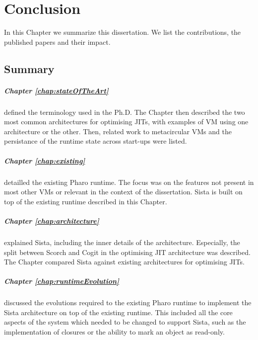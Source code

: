 \documentclass[a4paper,12pt,twoside]{../includes/ThesisStyle}
\begin{document}
\fi

\chapter{Conclusion}
\label{chap:conclusion}
\minitoc

In this Chapter we summarize this dissertation. We list the contributions, the published papers and their impact.

\section{Summary}

\paragraph{Chapter \ref{chap:stateOfTheArt}} defined the terminology used in the Ph.D. The Chapter then described the two most common architectures for optimising JITs, with examples of VM using one architecture or the other. Then, related work to metacircular VMs and the persistance of the runtime state across start-ups were listed.

\paragraph{Chapter \ref{chap:existing}} detailled the existing Pharo runtime. The focus was on the features not present in most other VMs or relevant in the context of the dissertation. Sista is built on top of the existing runtime described in this Chapter.

\paragraph{Chapter \ref{chap:architecture}} explained Sista, including the inner details of the architecture. Especially, the split between Scorch and Cogit in the optimising JIT architecture was described. The Chapter compared Sista against existing architectures for optimising JITs.

\paragraph{Chapter \ref{chap:runtimeEvolution}} discussed the evolutions required to the existing Pharo runtime to implement the Sista architecture on top of the existing runtime. This included all the core aspects of the system which needed to be changed to support Sista, such as the implementation of closures or the ability to mark an object as read-only.
\end{document}
